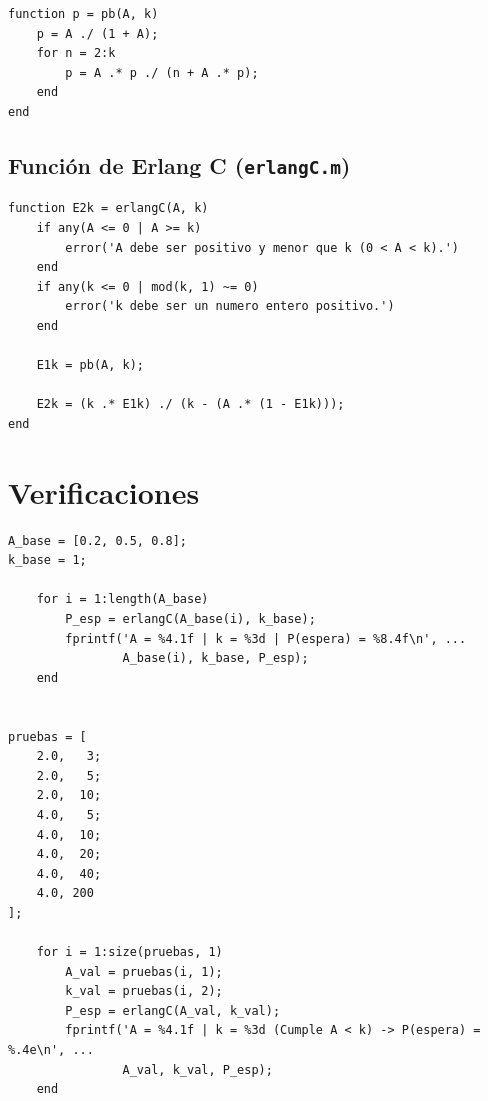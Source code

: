 \documentclass[11pt, a4paper]{article}
\begin{document}
\begin{lstlisting}
function p = pb(A, k)
    p = A ./ (1 + A);
    for n = 2:k
        p = A .* p ./ (n + A .* p);
    end
end
\end{lstlisting}

\subsection{Función de Erlang C (\texttt{erlangC.m})}

\begin{lstlisting}
function E2k = erlangC(A, k)
    if any(A <= 0 | A >= k)
        error('A debe ser positivo y menor que k (0 < A < k).') 
    end
    if any(k <= 0 | mod(k, 1) ~= 0)
        error('k debe ser un numero entero positivo.')
    end

    E1k = pb(A, k);

    E2k = (k .* E1k) ./ (k - (A .* (1 - E1k)));
end
\end{lstlisting}

\section{Verificaciones}

\begin{lstlisting}
A_base = [0.2, 0.5, 0.8];
k_base = 1;

    for i = 1:length(A_base)
        P_esp = erlangC(A_base(i), k_base);
        fprintf('A = %4.1f | k = %3d | P(espera) = %8.4f\n', ...
                A_base(i), k_base, P_esp);
    end


pruebas = [
    2.0,   3;
    2.0,   5;
    2.0,  10;
    4.0,   5;
    4.0,  10;
    4.0,  20;
    4.0,  40;
    4.0, 200
];

    for i = 1:size(pruebas, 1)
        A_val = pruebas(i, 1);
        k_val = pruebas(i, 2);
        P_esp = erlangC(A_val, k_val);
        fprintf('A = %4.1f | k = %3d (Cumple A < k) -> P(espera) = %.4e\n', ...
                A_val, k_val, P_esp);
    end
\end{lstlisting}
\end{document}
